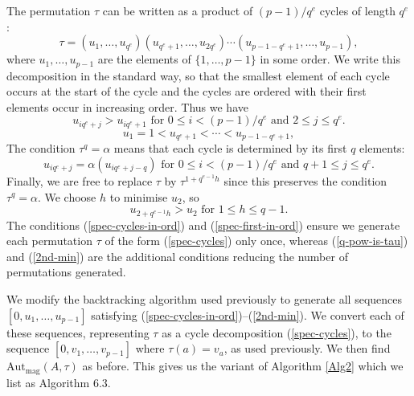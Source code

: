 \documentclass[letterpaper,12pt]{amsart}
\numberwithin{equation}{section}
\numberwithin{algorithm}{section}
\theoremstyle{definition}
\newcommand{\Autmag}{\mathrm{Aut}_\mathrm{mag}}
\begin{document}
The permutation $\tau$ can be written as a product of $(p-1)/q^e$ cycles of length $q^e$:
\begin{equation} \label{spec-cycles}
	\tau = (u_1, \ldots, u_{q^e}) (u_{q^e+1},  \ldots, u_{2q^e}) \cdots
	(u_{p-1-q^e+1}, \ldots, u_{p-1}),
\end{equation} 
where $u_1, \ldots, u_{p-1}$ are the elements of $\{1, \ldots, p-1\}$ in some order.
We write this decomposition in the standard way, so that the smallest element of each cycle occurs at the start of the cycle and the cycles are ordered with their first elements occur in increasing order. Thus we have
\begin{equation} \label{spec-cycles-in-ord}
	u_{i q^e+j} > u_{i q^e +1} \mbox{ for } 0 \leq i < (p-1)/q^e \mbox{ and } 2 \leq j \leq q^e.
\end{equation}
\begin{equation} \label{spec-first-in-ord}
	 u_1=1 < u_{q^e+1} < \cdots < u_{p-1-q^e+1}, 
\end{equation}
The condition $\tau^q=\alpha$ means that each cycle is determined by its first $q$ elements: 
\begin{equation}  \label{q-pow-is-tau}
  u_{i q^e + j} = \alpha(u_{iq^e +j-q})  \mbox{ for } 0 \leq i < (p-1)/q^e \mbox{ and } q+1 \leq j \leq q^e.
\end{equation}
Finally, we are free to replace $\tau$ by $\tau^{1+q^{e-1}h}$ since this preserves the condition $\tau^q=\alpha$. We choose $h$ to minimise $u_2$, so 
\begin{equation} \label{2nd-min}
	u_{2+q^{e-1} h} > u_2 \mbox{ for } 1 \leq h \leq q-1.
\end{equation}
The conditions (\ref{spec-cycles-in-ord}) and (\ref{spec-first-in-ord}) ensure we generate each permutation $\tau$ of the form (\ref{spec-cycles}) only once, whereas 
(\ref{q-pow-is-tau}) and (\ref{2nd-min}) are the additional conditions reducing the number of permutations generated.

We modify the backtracking algorithm used previously to generate all sequences $[0, u_1,\ldots, u_{p-1}]$ satisfying (\ref{spec-cycles-in-ord})--(\ref{2nd-min}). We convert each of these sequences, representing $\tau$ as a cycle decomposition (\ref{spec-cycles}), to the sequence
$[0, v_1,\ldots, v_{p-1}]$ where $\tau(a)=v_a$, as used previously. We then find $\Autmag(A,\tau)$ as before. This gives us the variant of Algorithm \ref{Alg2} which we list as Algorithm 6.3.
\end{document}
